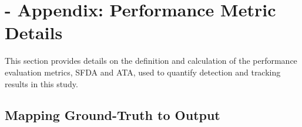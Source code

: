 \documentclass[twocolumn, final]{svjour3}
\begin{document}





\section{-  Appendix: Performance Metric Details}
\label{sec:performancemetricdetails}
This section provides details on the definition and calculation of the performance evaluation metrics, SFDA and ATA, used to quantify detection and tracking results in this study.

\subsection{Mapping Ground-Truth to Output}
\label{sec:mappingtoground}
\end{document}
